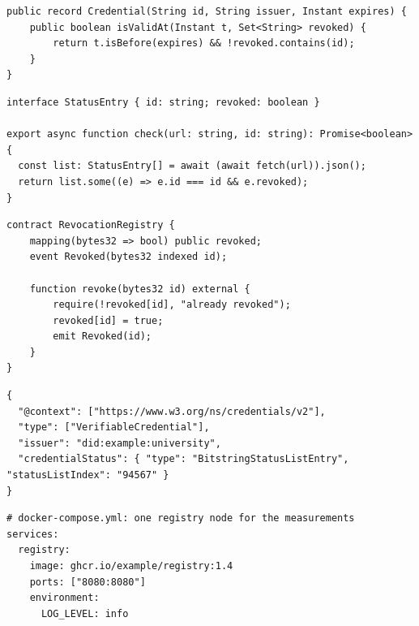 \begin{listing}[!ht]
\begin{verbatim}
public record Credential(String id, String issuer, Instant expires) {
    public boolean isValidAt(Instant t, Set<String> revoked) {
        return t.isBefore(expires) && !revoked.contains(id);
    }
}
\end{verbatim}
\caption{Java.}\label{guide:lst:latex:java}
\end{listing}

\begin{listing}[!ht]
\begin{verbatim}
interface StatusEntry { id: string; revoked: boolean }

export async function check(url: string, id: string): Promise<boolean> {
  const list: StatusEntry[] = await (await fetch(url)).json();
  return list.some((e) => e.id === id && e.revoked);
}
\end{verbatim}
\caption{TypeScript.}\label{guide:lst:latex:ts}
\end{listing}

\begin{listing}[!ht]
\begin{verbatim}
contract RevocationRegistry {
    mapping(bytes32 => bool) public revoked;
    event Revoked(bytes32 indexed id);

    function revoke(bytes32 id) external {
        require(!revoked[id], "already revoked");
        revoked[id] = true;
        emit Revoked(id);
    }
}
\end{verbatim}
\caption{Solidity.}\label{guide:lst:latex:solidity}
\end{listing}

\FloatBarrier
\begin{listing}[!ht]
\begin{verbatim}
{
  "@context": ["https://www.w3.org/ns/credentials/v2"],
  "type": ["VerifiableCredential"],
  "issuer": "did:example:university",
  "credentialStatus": { "type": "BitstringStatusListEntry", "statusListIndex": "94567" }
}
\end{verbatim}
\caption{JSON (a verifiable credential).}\label{guide:lst:latex:json}
\end{listing}

\begin{listing}[!ht]
\begin{verbatim}
# docker-compose.yml: one registry node for the measurements
services:
  registry:
    image: ghcr.io/example/registry:1.4
    ports: ["8080:8080"]
    environment:
      LOG_LEVEL: info
\end{verbatim}
\caption{YAML.}\label{guide:lst:latex:yaml}
\end{listing}

